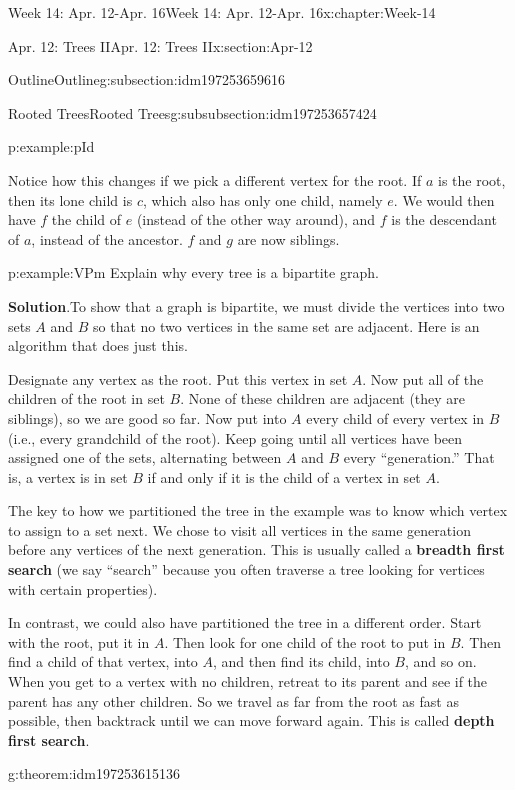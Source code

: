 \documentclass[oneside,10pt,]{book}
\newcommand{\blocktitlefont}{\relax}
\newcommand{\terminology}[1]{\textbf{#1}}
\numberwithin{equation}{section}
\begin{document}
\begin{chapterptx}{Week 14: Apr. 12-Apr. 16}{}{Week 14: Apr. 12-Apr. 16}{}{}{x:chapter:Week-14}
\begin{sectionptx}{Apr. 12: Trees II}{}{Apr. 12: Trees II}{}{}{x:section:Apr-12}
\begin{subsectionptx}{Outline}{}{Outline}{}{}{g:subsection:idm197253659616}
\begin{subsubsectionptx}{Rooted Trees}{}{Rooted Trees}{}{}{g:subsubsection:idm197253657424}
\begin{example}{}{p:example:pId}
\par
Notice how this changes if we pick a different vertex for the root.  If \(a\) is the root, then its lone child is \(c\), which also has only one child, namely \(e\).  We would then have \(f\) the child of \(e\) (instead of the other way around), and \(f\) is the descendant of \(a\), instead of the ancestor.  \(f\) and \(g\) are now siblings.%
\end{example}
\begin{example}{}{p:example:VPm}%
Explain why every tree is a bipartite graph.%
\par\smallskip%
\noindent\textbf{\blocktitlefont Solution}.\hypertarget{p:solution:rxq}{}\quad{}To show that a graph is bipartite, we must divide the vertices into two sets \(A\) and \(B\) so that no two vertices in the same set are adjacent.  Here is an algorithm that does just this.%
\par
Designate any vertex as the root.  Put this vertex in set \(A\).  Now put all of the children of the root in set \(B\).  None of these children are adjacent (they are siblings), so we are good so far.  Now put into \(A\) every child of every vertex in \(B\) (i.e., every grandchild of the root).  Keep going until all vertices have been assigned one of the sets, alternating between \(A\) and \(B\) every ``generation.''  That is, a vertex is in set \(B\) if and only if it is the child of a vertex in set \(A\).%
\end{example}
 The key to how we partitioned the tree in the example was to know which vertex to assign to a set next.  We chose to visit all vertices in the same generation before any vertices of the next generation.  This is usually called a \terminology{breadth first search} (we say ``search'' because you often traverse a tree looking for vertices with certain properties).%
\par
{} In contrast, we could also have partitioned the tree in a different order.  Start with the root, put it in \(A\).  Then look for one child of the root to put in \(B\).  Then find a child of that vertex, into \(A\), and then find its child, into \(B\), and so on.  When you get to a vertex with no children, retreat to its parent and see if the parent has any other children.  So we travel as far from the root as fast as possible, then backtrack until we can move forward again.  This is called \terminology{depth first search}.%
\begin{theorem}{}{}{g:theorem:idm197253615136}%

\end{theorem}
\end{subsubsectionptx}
\end{subsectionptx}
\end{sectionptx}
\end{chapterptx}
\end{document}
